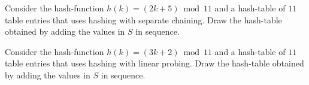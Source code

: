 \begin{problem}
\begin{questions}

\item Consider the hash-function $h(k) = (2k + 5) \bmod 11$ and a hash-table of $11$ table entries that uses hashing with separate chaining. Draw the hash-table obtained by adding the values in $S$ in sequence.


\item Consider the hash-function $h(k) = (3k + 2) \bmod 11$ and a hash-table of $11$ table entries that uses hashing with linear probing. Draw the hash-table obtained by adding the values in $S$ in sequence.


\end{questions}
\end{problem}


